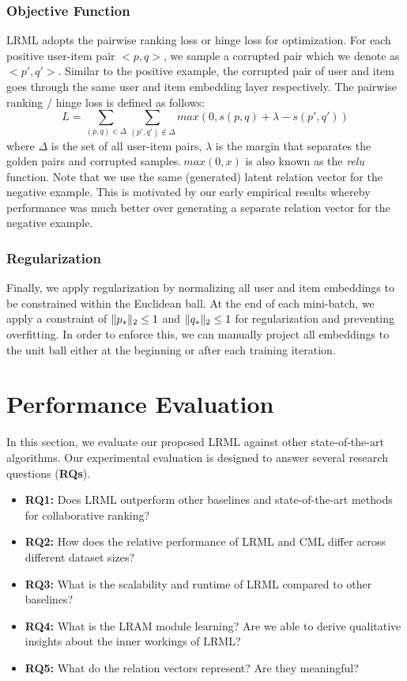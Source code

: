 \documentclass[sigconf]{acmart}
\DeclarePairedDelimiter\norm{\lVert}{\rVert}
\begin{document}
\subsubsection{Objective Function}
\textsc{LRML} adopts the pairwise ranking loss or hinge loss for optimization. For each positive user-item pair $<p,q>$, we sample a corrupted pair which we denote as $<p',q'>$. Similar to the positive example, the corrupted pair of user and item goes through the same user and item embedding layer respectively. The pairwise ranking / hinge loss is defined as follows:
\begin{equation}
L =  \sum_{(p,q) \in \Delta} \sum_{(p',q') \not\in \Delta} max(0,s(p,q) + \lambda - s(p',q'))
\end{equation}
where $\Delta$ is the set of all user-item pairs, $\lambda$ is the margin that separates the golden pairs and corrupted samples.$\: max(0,x)$ is also known as the \textit{relu} function. Note that we use the same (generated) latent relation vector for the negative example. This is motivated by our early empirical results whereby performance was much better over generating a separate relation vector for the negative example. 
\subsubsection{Regularization}
Finally, we apply regularization by normalizing all user and item embeddings to be constrained within the Euclidean ball. At the end of each mini-batch, we apply a constraint of $\norm{p_*}_2 \leq 1$ and $\norm{q_*}_2 \leq 1$ for regularization and preventing overfitting. In order to enforce this, we can manually project all embeddings to the unit ball either at the beginning or after each training iteration. 





\section{Performance Evaluation}
In this section, we evaluate our proposed \textsc{LRML} against other state-of-the-art algorithms. Our experimental evaluation is designed to answer several research questions (\textbf{RQs}).
\begin{itemize}
\item \textbf{RQ1:} Does LRML outperform other baselines and state-of-the-art methods for collaborative ranking? 
\item \textbf{RQ2:} How does the relative performance of LRML and CML differ across different dataset sizes?
\item \textbf{RQ3:} What is the scalability and runtime of LRML compared to other baselines?
\item \textbf{RQ4:} What is the LRAM module learning? Are we able to derive qualitative insights about the inner workings of LRML?
\item \textbf{RQ5:} What do the relation vectors represent? Are they meaningful?
\end{itemize}
\end{document}
